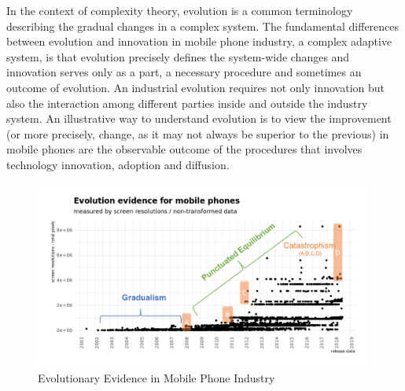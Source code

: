 \documentclass[utf8,english]{gradu3}
\begin{document}
In the context of complexity theory, evolution is a common terminology describing the gradual changes in a complex system. The fundamental differences between evolution and innovation in mobile phone industry, a complex adaptive system, is that evolution precisely defines the system-wide changes and innovation serves only as a part, a necessary procedure and sometimes an outcome of evolution. An industrial evolution requires not only innovation but also the interaction among different parties inside and outside the industry system. An illustrative way to understand evolution is to view the improvement (or more precisely, change, as it may not always be superior to the previous) in mobile phones are the observable outcome of the procedures that involves technology innovation, adoption and diffusion.

\begin{figure}[htb]
    \centering
    \includegraphics[width=0.99\textwidth]{evo.png}
    \caption{Evolutionary Evidence in Mobile Phone Industry}
    \label{fig:evoMethods}
\end{figure}
\end{document}
